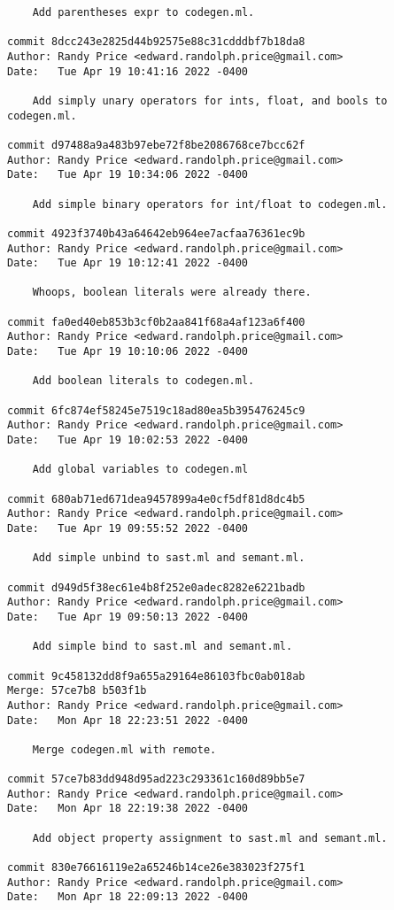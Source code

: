 {\begin{verbatim}
    Add parentheses expr to codegen.ml.

commit 8dcc243e2825d44b92575e88c31cdddbf7b18da8
Author: Randy Price <edward.randolph.price@gmail.com>
Date:   Tue Apr 19 10:41:16 2022 -0400

    Add simply unary operators for ints, float, and bools to codegen.ml.

commit d97488a9a483b97ebe72f8be2086768ce7bcc62f
Author: Randy Price <edward.randolph.price@gmail.com>
Date:   Tue Apr 19 10:34:06 2022 -0400

    Add simple binary operators for int/float to codegen.ml.

commit 4923f3740b43a64642eb964ee7acfaa76361ec9b
Author: Randy Price <edward.randolph.price@gmail.com>
Date:   Tue Apr 19 10:12:41 2022 -0400

    Whoops, boolean literals were already there.

commit fa0ed40eb853b3cf0b2aa841f68a4af123a6f400
Author: Randy Price <edward.randolph.price@gmail.com>
Date:   Tue Apr 19 10:10:06 2022 -0400

    Add boolean literals to codegen.ml.

commit 6fc874ef58245e7519c18ad80ea5b395476245c9
Author: Randy Price <edward.randolph.price@gmail.com>
Date:   Tue Apr 19 10:02:53 2022 -0400

    Add global variables to codegen.ml

commit 680ab71ed671dea9457899a4e0cf5df81d8dc4b5
Author: Randy Price <edward.randolph.price@gmail.com>
Date:   Tue Apr 19 09:55:52 2022 -0400

    Add simple unbind to sast.ml and semant.ml.

commit d949d5f38ec61e4b8f252e0adec8282e6221badb
Author: Randy Price <edward.randolph.price@gmail.com>
Date:   Tue Apr 19 09:50:13 2022 -0400

    Add simple bind to sast.ml and semant.ml.

commit 9c458132dd8f9a655a29164e86103fbc0ab018ab
Merge: 57ce7b8 b503f1b
Author: Randy Price <edward.randolph.price@gmail.com>
Date:   Mon Apr 18 22:23:51 2022 -0400

    Merge codegen.ml with remote.

commit 57ce7b83dd948d95ad223c293361c160d89bb5e7
Author: Randy Price <edward.randolph.price@gmail.com>
Date:   Mon Apr 18 22:19:38 2022 -0400

    Add object property assignment to sast.ml and semant.ml.

commit 830e76616119e2a65246b14ce26e383023f275f1
Author: Randy Price <edward.randolph.price@gmail.com>
Date:   Mon Apr 18 22:09:13 2022 -0400


\end{verbatim}}
